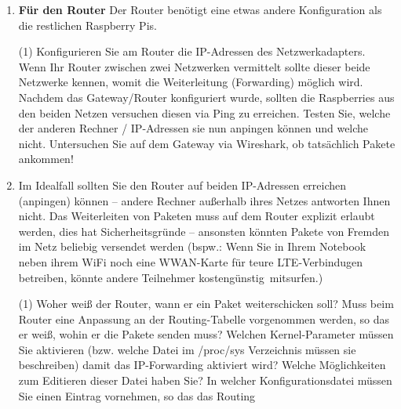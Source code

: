 \documentclass[paper=a4,fontsize=11pt]{scrartcl}%
\numberwithin{equation}{section}
\begin{document}
{\begin{enumerate}
	\begin{tasks}(1)
		\task Als Testphase sollten Sie dies noch nicht in Systemdateien schreiben, sondern wie in der vorigen Übung erst mal \glqq on the fly\grqq\ erledigen (später können diese auch persistiert werden).
		\task Die Kommandos \emph{ip route [add|delete|replace]} aus dem \emph{iproute2}-Werkzeugkasten, wie auch die \emph{Networking-Tools} \emph{route add} ermöglichen Ihnen das Festlegen des Gateways. Achten Sie darauf, ob Sie ein Default-Gateway definieren oder ein \glqq herkömmliches\grqq\ Gateway. Worin besteht der Unterschied zwischen beiden Gateway-Varianten.	
	\end{tasks}
	\item \textbf{Für den Router} Der Router benötigt eine etwas andere Konfiguration als die restlichen Raspberry Pis. 
	\begin{tasks}(1)
		\task Konfigurieren Sie am Router die IP-Adressen des Netzwerkadapters. Wenn Ihr Router zwischen zwei Netzwerken vermittelt sollte dieser beide Netzwerke kennen, womit die Weiterleitung (Forwarding) möglich wird.
		\task Nachdem das Gateway/Router konfiguriert wurde, sollten die Raspberries aus den beiden Netzen versuchen diesen via Ping zu erreichen.
		\task Testen Sie, welche der anderen Rechner / IP-Adressen sie nun anpingen können und welche nicht.
		\task Untersuchen Sie auf dem Gateway via Wireshark, ob tatsächlich Pakete ankommen! 
	\end{tasks}
	\item Im Idealfall sollten Sie den Router auf beiden IP-Adressen erreichen (anpingen) können -- andere Rechner außerhalb ihres Netzes antworten Ihnen nicht. Das Weiterleiten von Paketen muss auf dem Router explizit erlaubt werden, dies hat Sicherheitsgründe -- ansonsten könnten Pakete von Fremden im Netz beliebig versendet werden (bspw.: Wenn Sie in Ihrem Notebook neben ihrem WiFi noch eine WWAN-Karte für teure LTE-Verbindugen betreiben, könnte andere Teilnehmer \glqq kostengünstig\grqq\ mitsurfen.)
	\begin{tasks}(1)
		\task Woher weiß der Router, wann er ein Paket weiterschicken soll?
                \task Muss beim Router eine Anpassung an der Routing-Tabelle vorgenommen werden, so das er weiß, wohin er die Pakete senden muss?
                \task Welchen Kernel-Parameter müssen Sie aktivieren (bzw. welche Datei im /proc/sys Verzeichnis müssen sie beschreiben) damit das IP-Forwarding aktiviert wird? Welche Möglichkeiten zum Editieren dieser Datei haben Sie?
		\task In welcher Konfigurationsdatei müssen Sie einen Eintrag vornehmen, so das das Routing

\end{tasks}
\end{enumerate}}
\end{document}

